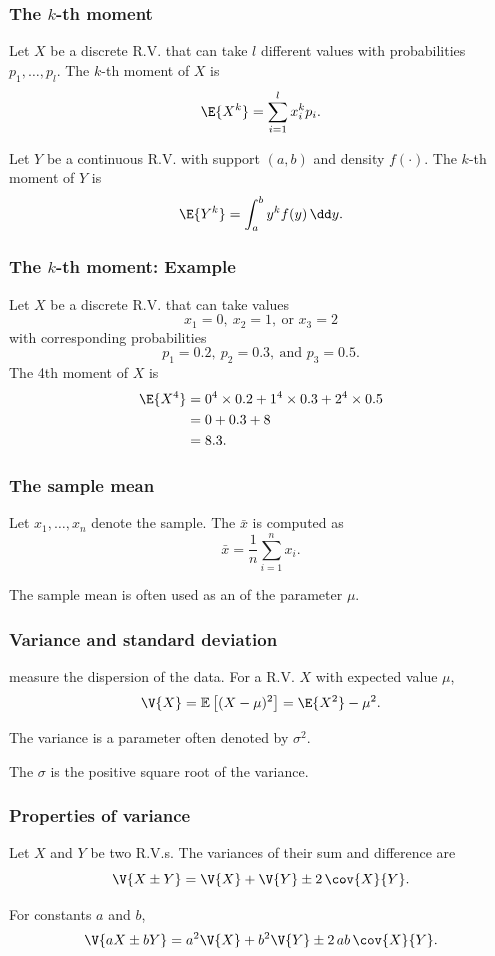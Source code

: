 \documentclass[compress]{beamer}\usepackage[]{graphicx}\usepackage[]{xcolor}
\begin{document}
\begin{frame}[fragile]
  \frametitle{The $k$-th moment}
    Let $X$ be a discrete R.V. that can take $l$ different values with probabilities $p_1, \dots, p_l$. The $k$-th moment of $X$ is
      \[ \E{X^k} = \sum_{i=1}^l x_i^k p_i. \]

    Let $Y$ be a continuous R.V. with support $(a, b)$ and density $f(\cdot)$. The $k$-th moment of $Y$ is
      \[ \E{Y^k} = \int_a^b y^k f(y)\, \dd y. \]
\end{frame}


\begin{frame}[fragile]
  \frametitle{The $k$-th moment: Example}
    Let $X$ be a discrete R.V. that can take values
      \[ x_1 = 0,\ x_2 = 1,\ \text{or } x_3 = 2 \]
    with corresponding probabilities
      \[ p_1 = 0.2,\ p_2 = 0.3,\ \text{and } p_3 = 0.5. \]
    The 4th moment of $X$ is
    \begin{equation*}
      \begin{aligned}
        \E{X^4} &= 0^4 \times 0.2 + 1^4 \times 0.3 + 2^4 \times 0.5 \\
                &= 0 + 0.3 + 8\\
                &= 8.3.
      \end{aligned}
    \end{equation*}
\end{frame}


\begin{frame}[fragile]
  \frametitle{The sample mean}
    Let $x_1, \dots, x_n$ denote the sample. The  $\bar{x}$ is computed as
      \[ \bar{x}=\frac{1}{n}\sum_{i=1}^n x_i. \]

    The sample mean is often used as an  of the parameter $\mu$.
\end{frame}


\begin{frame}[fragile]
  \frametitle{Variance and standard deviation}
     measure the dispersion of the data. For a R.V. $X$ with expected value $\mu$,
      \[ \V{X} = \mathbb{E} \left[ (X - \mu)^2 \right] = \E{X^2} - \mu^2. \]

    The variance is a parameter often denoted by $\sigma^2$.

    The  $\sigma$ is the positive square root of the variance.
\end{frame}


\begin{frame}[fragile]
  \frametitle{Properties of variance}
    Let $X$ and $Y$ be two R.V.s. The variances of their sum and difference are
      \[ \V{X \pm Y} = \V{X} + \V{Y} \pm 2\,\cov{X}{Y}. \]

    For constants $a$ and $b$,
      \[ \V{aX \pm bY} = a^2 \V{X} + b^2 \V{Y} \pm 2\,ab\,\cov{X}{Y}. \]
\end{frame}
\end{document}
